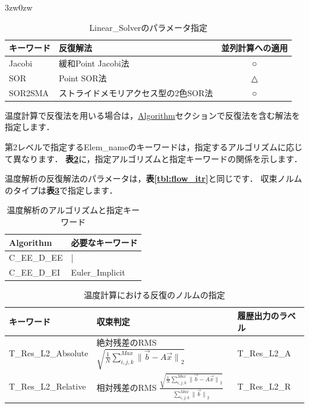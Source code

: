 \begin{indentation}{3zw}{0zw}
\begin{table}[htdp]
\caption{Linear\_Solverのパラメータ指定}
\begin{center}
\small
\begin{tabular}{llc} \toprule
キーワード & 反復解法 & 並列計算への適用\\ \midrule
Jacobi & 緩和Point Jacobi法 & ○\\
SOR & Point SOR法 & △\\
SOR2SMA & ストライドメモリアクセス型の2色SOR法 & ○\\ \bottomrule
\end{tabular}
\end{center}
\label{tbl:LS}
\end{table}

\pagebreak

温度計算で反復法を用いる場合は，\hyperlink{tgt:algorithm}{Algorithm}セクションで反復法を含む解法を指定します．

第2レベルで指定するElem\_nameのキーワードは，指定するアルゴリズムに応じて異なります．
\textbf{表\ref{tbl:itr_temp_algo}}に，指定アルゴリズムと指定キーワードの関係を示します．

温度解析の反復解法のパラメータは，\textbf{表\ref{tbl:flow_itr}}と同じです．
収束ノルムのタイプは\textbf{表\ref{tbl:norm-type4temp}}で指定します．

\begin{table}[htdp]
\caption{温度解析のアルゴリズムと指定キーワード}
\begin{center}
\small
\begin{tabular}{ll} \toprule
Algorithm &  必要なキーワード\\ \midrule
C\_EE\_D\_EE & | \\
C\_EE\_D\_EI & Euler\_Implicit\\ \bottomrule
\end{tabular}
\end{center}
\label{tbl:itr_temp_algo}
\end{table}

\begin{table}[htdp]
\caption{温度計算における反復のノルムの指定}
\begin{center}
\small
\begin{tabular}{lll} \toprule
キーワード & 収束判定 & 履歴出力のラベル\\ \midrule
\vspace{2mm}
T\_Res\_L2\_Absolute & 絶対残差のRMS $\displaystyle \sqrt{ \frac{1}{N} \sum_{i,j,k}^{Max} {\|\vec{b}- A \vec{x}\|}_{2} }$ & T\_Res\_L2\_A\\ 
T\_Res\_L2\_Relative & 相対残差のRMS $\displaystyle {\frac{ \sqrt{ \frac{1}{N} \sum_{i,j,k}^{Max}{\|\vec{b}- A \vec{x}\|}_{2}} } {\sum_{i,j,k}^{Max} {\|\vec{b}\|}_{2} }}$ & T\_Res\_L2\_R\\ \bottomrule
\end{tabular}
\end{center}
\label{tbl:norm-type4temp}
\end{table}

\end{indentation}
